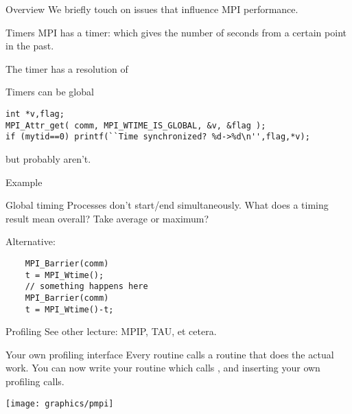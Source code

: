
\begin{frame}[containsverbatim]{Overview}
  We briefly touch on issues that influence MPI performance.
\end{frame}


\begin{frame}[containsverbatim]{Timers}
  MPI has a  timer: 
  which gives the number of seconds from a certain point in the past.

  The timer has a resolution of 

  Timers can be global
\begin{lstlisting}
int *v,flag;
MPI_Attr_get( comm, MPI_WTIME_IS_GLOBAL, &v, &flag );
if (mytid==0) printf(``Time synchronized? %d->%d\n'',flag,*v);
\end{lstlisting}
  but probably aren't.
\end{frame}

\begin{frame}[containsverbatim]{Example}
\end{frame}

\begin{frame}[containsverbatim]{Global timing}
  Processes don't start/end simultaneously. What does a timing result
  mean overall? Take average or maximum?

  Alternative:
  \begin{lstlisting}
    MPI_Barrier(comm)
    t = MPI_Wtime();
    // something happens here
    MPI_Barrier(comm)
    t = MPI_Wtime()-t;
  \end{lstlisting}
\end{frame}

\begin{frame}[containsverbatim]{Profiling}
  See other lecture: 
  MPIP, TAU, et cetera.
\end{frame}

\begin{frame}[containsverbatim]{Your own profiling interface}
  Every routine  calls a routine  that 
  does the actual work. You can now write your  routine
  which calls , and inserting your own profiling calls.

  \texttt{[image: graphics/pmpi]}
\end{frame}

